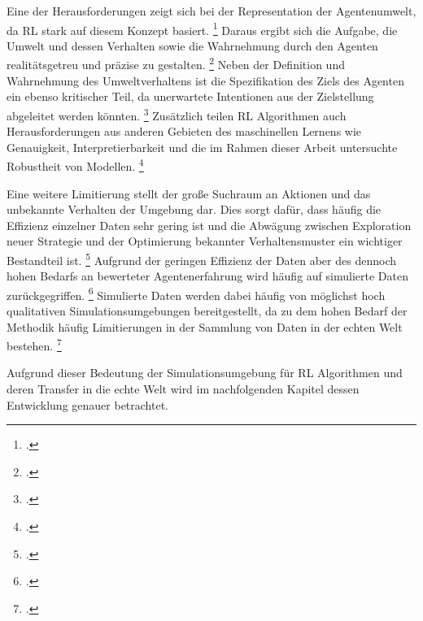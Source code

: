 Eine der Herausforderungen zeigt sich bei der Representation der Agentenumwelt, da RL stark auf diesem Konzept basiert. \footcite[Vgl.][S. 8]{Sutton.2018}
Daraus ergibt sich die Aufgabe, die Umwelt und dessen Verhalten sowie die Wahrnehmung durch den Agenten realitätsgetreu und präzise zu gestalten. \footcite[Vgl.][S. 7]{Sutton.2018}
Neben der Definition und Wahrnehmung des Umweltverhaltens ist die Spezifikation des Ziels des Agenten ein ebenso kritischer Teil, da unerwartete Intentionen aus der Zielstellung abgeleitet werden könnten. \footcite[Vgl.][S. 7]{Li.2019}
Zusätzlich teilen RL Algorithmen auch Herausforderungen aus anderen Gebieten des maschinellen Lernens wie Genauigkeit, Interpretierbarkeit und die im Rahmen dieser Arbeit untersuchte Robustheit von Modellen. \footcite[Vgl.][S. 7]{Li.2019}

Eine weitere Limitierung stellt der große Suchraum an Aktionen und das unbekannte Verhalten der Umgebung dar.
Dies sorgt dafür, dass häufig die Effizienz einzelner Daten sehr gering ist und die Abwägung zwischen Exploration neuer Strategie und der Optimierung bekannter Verhaltensmuster ein wichtiger Bestandteil ist. \footcite[Vgl.][S. 7]{Li.2019}
Aufgrund der geringen Effizienz der Daten aber des dennoch hohen Bedarfs an bewerteter Agentenerfahrung wird häufig auf simulierte Daten zurückgegriffen. \footcite[Vgl.][S. 7]{Zhao.2020}
Simulierte Daten werden dabei häufig von möglichst hoch qualitativen Simulationsumgebungen bereitgestellt, da zu dem hohen Bedarf der Methodik häufig Limitierungen in der Sammlung von Daten in der echten Welt bestehen. \footcite[Vgl.][S. 8]{Li.2019}

Aufgrund dieser Bedeutung der Simulationsumgebung für RL Algorithmen und deren Transfer in die echte Welt wird im nachfolgenden Kapitel dessen Entwicklung genauer betrachtet.